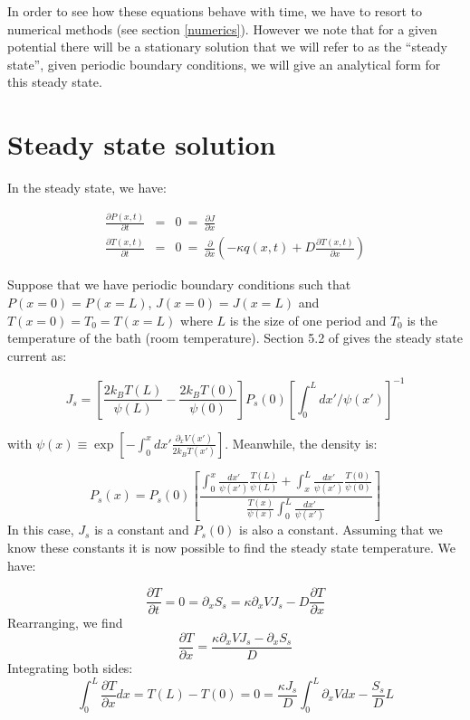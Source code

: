 In order to see how these equations behave with time, we have to resort to numerical methods (see section \ref{numerics}). However we note that for a given potential there will be a stationary solution that we will refer to as the ``steady state'', given periodic boundary conditions, we will give an analytical form for this steady state.

\section{Steady state solution} \label{SteadyState}
In the steady state, we have:

\begin{eqnarray}
\frac{\partial P(x, t)}{\partial t} &=&  0 \ = \ \frac{\partial J}{\partial x} \label{eqn:SmoluchowskiSteady} \\
\frac{\partial T(x, t)}{\partial t} &=& 0 \ = \ \frac{\partial}{\partial x} \left ( -\kappa q(x, t) + D \frac{\partial T(x, t)}{\partial x} \right ) \label{eqn:TemperatureSteady}
\end{eqnarray}

Suppose that we have periodic boundary conditions such that $P(x = 0) = P(x = L)$,  $J(x = 0) = J(x = L)$ and $T(x = 0) = T_0 = T(x = L)$ where $L$ is the size of one period and $T_0$ is the temperature of the bath (room temperature). Section 5.2 of \cite{Gardiner2009} gives the steady state current as:

\begin{equation}
J_s = \left [\frac{2 k_B T(L)}{\psi(L)} - \frac{2 k_B T(0)}{\psi(0)}  \right] P_s(0) \left [\int_0^L dx'/\psi(x') \right]^{-1}
\label{eqn:SteadyCurrent}
\end{equation}

with $\psi(x) \equiv \exp[-\int_0^x dx' \frac{\partial_x V(x')}{2 k_B T(x')}]$. Meanwhile, the density is:

\begin{equation}
P_s(x) = P_s(0) \left [\frac{\int_0^x \frac{dx'}{\psi(x')} \frac{T(L)}{\psi(L)} + \int_x^L \frac{dx'}{\psi(x')} \frac{T(0)}{\psi(0)} }{\frac{T(x)}{\psi(x)} \int_0^L \frac{dx'}{\psi(x')} } \right]
\label{eqn:SteadyDensity}
\end{equation}
In this case, $J_s$ is a constant and $P_s(0)$ is also a constant. Assuming that we know these constants it is now possible to find the steady state temperature. We have:

\begin{equation}
\frac{\partial T}{\partial t} = 0 =  \partial_x S_s = \kappa \partial_x V J_s - D \frac{\partial T}{\partial x}
\end{equation}
Rearranging, we find
\begin{equation}
\frac{\partial T}{\partial x} = \frac{\kappa \partial_x V J_s - \partial_x S_s}{D}
\end{equation}
Integrating both sides:
\begin{equation}
\int_0^L \frac{\partial T}{\partial x} dx = T(L) - T(0) = 0 = \frac{\kappa J_s}{D} \int_0^L \partial_x V dx - \frac{S_s}{D}L
\end{equation}

